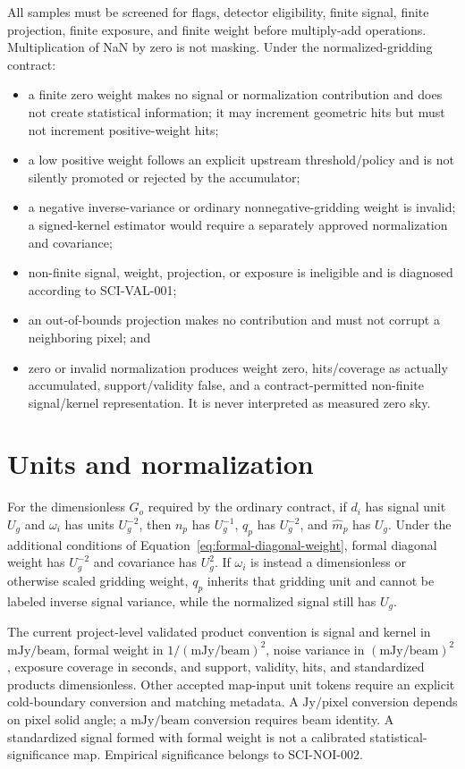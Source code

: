 \documentclass[11pt]{article}
\begin{document}
All samples must be screened for flags, detector eligibility, finite signal,
finite projection, finite exposure, and finite weight before multiply-add
operations. Multiplication of NaN by zero is not masking. Under the
normalized-gridding contract:
\begin{itemize}
\item a finite zero weight makes no signal or normalization contribution and
does not create statistical information; it may increment geometric hits but
must not increment positive-weight hits;
\item a low positive weight follows an explicit upstream threshold/policy and
is not silently promoted or rejected by the accumulator;
\item a negative inverse-variance or ordinary nonnegative-gridding weight is
invalid; a signed-kernel estimator would require a separately approved
normalization and covariance;
\item non-finite signal, weight, projection, or exposure is ineligible and is
diagnosed according to SCI-VAL-001;
\item an out-of-bounds projection makes no contribution and must not corrupt a
neighboring pixel; and
\item zero or invalid normalization produces weight zero, hits/coverage as
actually accumulated, support/validity false, and a contract-permitted
non-finite signal/kernel representation. It is never interpreted as measured
zero sky.
\end{itemize}

\section{Units and normalization}

For the dimensionless \(G_o\) required by the ordinary contract, if \(d_i\)
has signal unit \(U_g\) and \(\omega_i\) has units \(U_g^{-2}\),
then \(n_p\) has \(U_g^{-1}\), \(q_p\) has \(U_g^{-2}\), and
\(\widehat m_p\) has \(U_g\). Under the additional conditions of
Equation~\eqref{eq:formal-diagonal-weight}, formal diagonal weight has
\(U_g^{-2}\) and covariance has \(U_g^2\). If \(\omega_i\) is instead a
dimensionless or otherwise scaled gridding weight, \(q_p\) inherits that
gridding unit and cannot be labeled inverse signal variance, while the
normalized signal still has \(U_g\).

The current project-level validated product convention is signal and kernel in
\(\mathrm{mJy/beam}\), formal weight in
\(1/(\mathrm{mJy/beam})^2\), noise variance in
\((\mathrm{mJy/beam})^2\), exposure coverage in seconds, and support,
validity, hits, and standardized products dimensionless. Other accepted
map-input unit tokens require an explicit cold-boundary conversion and matching
metadata. A \(\mathrm{Jy/pixel}\) conversion depends on pixel solid angle; a
\(\mathrm{mJy/beam}\) conversion requires beam identity. A standardized signal
formed with formal weight is not a calibrated statistical-significance map.
Empirical significance belongs to SCI-NOI-002.
\end{document}
